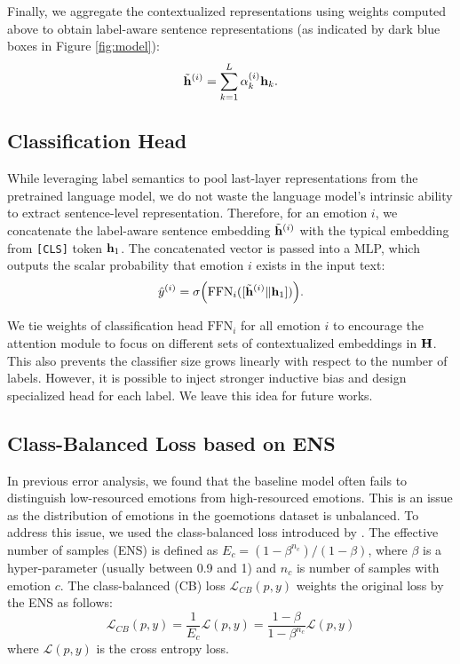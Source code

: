 Finally, we aggregate the contextualized representations using weights computed above to obtain label-aware sentence representations (as indicated by dark blue boxes in Figure \ref{fig:model}): 
$$\tilde{\mathbf{h}}^{(i)} = \sum_{k = 1}^L \alpha_k^{(i)} \mathbf{h}_k.$$

\subsection{Classification Head}

While leveraging label semantics to pool last-layer representations from the pretrained language model, we do not waste the language model's intrinsic ability to extract sentence-level representation. Therefore, for an emotion $i$, we concatenate the label-aware sentence embedding $\tilde{\mathbf{h}}^{(i)}$ with the typical embedding from \texttt{[CLS]} token $\mathbf{h}_1$. The concatenated vector is passed into a MLP, which outputs the scalar probability that emotion $i$ exists in the input text: 
$$\hat{y}^{(i)} = \sigma\Bigl( \text{FFN}_i ([\tilde{\mathbf{h}}^{(i)} \| \mathbf{h}_1]) \Bigr).$$

We tie weights of classification head $\text{FFN}_{i}$ for all emotion $i$ to encourage the attention module to focus on different sets of contextualized embeddings in $\mathbf{H}$. This also prevents the classifier size grows linearly with respect to the number of labels. However, it is possible to inject stronger inductive bias and design specialized head for each label. We leave this idea for future works. 

\subsection{Class-Balanced Loss based on ENS}
In previous error analysis, we found that the baseline model often fails to distinguish low-resourced emotions from high-resourced emotions. This is an issue as the distribution of emotions in the goemotions dataset is unbalanced. To address this issue, we used the class-balanced loss introduced by \citet{cui2019classbalanced}. The effective number of samples (ENS) is defined as 
$
E_c = (1-\beta^{n_c}) / (1-\beta) 
$, where $\beta$ is a hyper-parameter (usually between 0.9 and 1) and $n_c$ is number of samples with emotion $c$. The class-balanced (CB) loss $\mathcal{L}_{CB}(p, y)$ weights the original loss by the ENS as follows:
$$
\mathcal{L}_{CB}(p, y) = \dfrac{1}{E_c} \mathcal{L} (p, y) = \dfrac{1-\beta}{1-\beta^{n_c}}\mathcal{L} (p, y)
$$
where $\mathcal{L} (p, y)$ is the cross entropy loss. 